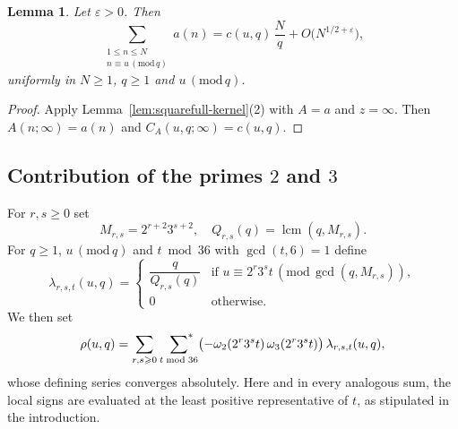 \documentclass[12pt,reqno]{amsart}
\numberwithin{equation}{section}
\newtheorem{lemma}[theorem]{Lemma}
\theoremstyle{definition}
\renewcommand{\le}{\leqslant}
\renewcommand{\ge}{\geqslant}
\newcommand{\sumstar}{\sideset{}{^*}\sum}
\renewcommand{\pmod}[1]{\,(\mathrm{mod}\,#1)}
\begin{document}
\begin{lemma}\label{lem:sum-a}
Let $\varepsilon>0$.
Then
\begin{equation}\label{eq:sum-a}
\sum_{\substack{1\le n\le N\\ n\equiv u\pmod q}} a(n)
=c(u,q) \, \frac{N}{q} +O\big(N^{1/2+\varepsilon}\big),
\end{equation}
uniformly in $N\ge 1$, $q\ge 1$ and $u\pmod q$.
\end{lemma}

\begin{proof}
Apply Lemma~\ref{lem:squarefull-kernel}(2) with $A=a$ and $z=\infty$.
Then $A(n;\infty)=a(n)$ and $C_A(u,q;\infty)=c(u,q)$.
\end{proof}

\subsection{Contribution of the primes $2$ and $3$}

For $r,s\ge 0$ set
\[
M_{r,s}=2^{r+2}3^{s+2},
\quad
Q_{r,s}(q)=\operatorname{lcm}(q,M_{r,s}).
\]
For $q\ge 1$, $u\pmod q$ and $t\bmod36$ with $\gcd(t,6)=1$ define
\begin{equation*}
\lambda_{r,s,t}(u,q)=
\begin{cases}
\dfrac{q}{Q_{r,s}(q)} & \text{if } u\equiv2^r3^s t\pmod{\gcd(q,M_{r,s})},\\
0 & \text{otherwise}.
\end{cases}
\end{equation*}
We then set
\begin{equation}\label{eq:def-rho}
\rho(u,q)=\sum_{r,s\ge 0}\ \sumstar_{t\bmod36}
\bigl(-\omega_2(2^{r}3^{s}t)\,\omega_3(2^{r}3^{s}t)\bigr)\,
\lambda_{r,s,t}(u,q),
\end{equation}
whose defining series converges absolutely.
Here and in every analogous sum, the local signs are evaluated at the least positive representative of $t$, as stipulated in the introduction.
\end{document}
